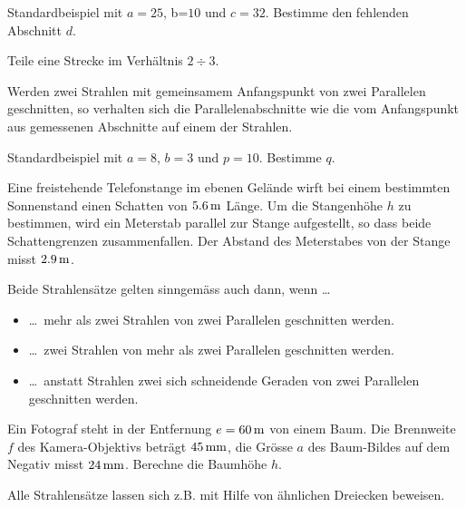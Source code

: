 \documentclass[%
11pt,%
twoside,%
titlepage,%
german,%
headsepline%
]{scrartcl}
\begin{document}
\begin{bsp}
Standardbeispiel mit $a=25$, b=$10$ und $c=32$. Bestimme den fehlenden Abschnitt $d$.%
\end{bsp}

\begin{ueb}
Teile eine Strecke im Verh\"altnis $2\div3$.
\end{ueb}

\begin{csatz}[2. Strahlensatz]{}
Werden zwei Strahlen mit gemeinsamem Anfangspunkt von zwei Parallelen geschnitten, so verhalten sich die Parallelenabschnitte wie die vom Anfangspunkt aus gemessenen Abschnitte auf einem der Strahlen.%
\end{csatz}

\begin{bsp}
Standardbeispiel mit $a=8$, $b=3$ und $p=10$. Bestimme $q$.%
\end{bsp}

\begin{ueb}
Eine freistehende Telefonstange im ebenen Gel\"ande wirft bei einem bestimmten Sonnenstand einen Schatten von $\unit[5.6]{m}$ L\"ange. Um die Stangenh\"ohe $h$ zu bestimmen, wird ein Meterstab parallel zur Stange aufgestellt, so dass beide Schattengrenzen zusammenfallen. Der Abstand des Meterstabes von der Stange misst $\unit[2.9]{m}$.
\end{ueb}

Beide Strahlens\"atze gelten sinngem\"ass auch dann, wenn \dots
\begin{itemize}
\item \dots\ mehr als zwei Strahlen von zwei Parallelen geschnitten werden.
\item \dots\ zwei Strahlen von mehr als zwei Parallelen geschnitten werden.
\item \dots\ anstatt Strahlen zwei sich schneidende Geraden von zwei Parallelen geschnitten werden.
\end{itemize}

\begin{bsp}
Ein Fotograf steht in der Entfernung $e=\unit[60]{m}$ von einem Baum. Die Brennweite $f$ des Kamera-Objektivs betr\"agt $\unit[45]{mm}$, die Gr\"osse $a$ des Baum-Bildes auf dem Negativ misst $\unit[24]{mm}$. Berechne die Baumh\"ohe $h$.%
\end{bsp}
Alle Strahlens\"atze lassen sich z.B. mit Hilfe von \"ahnlichen Dreiecken beweisen.
\end{document}
